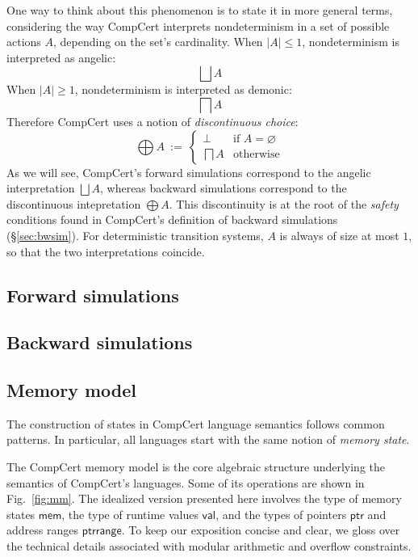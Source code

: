 \documentclass[draft,11pt]{report}
\theoremstyle{definition}
\newcommand{\kw}[1]{\ensuremath{ \mathsf{#1} }}
\begin{document}
One way to think about this phenomenon is to state it
in more general terms,
considering the way CompCert interprets nondeterminism
in a set of possible actions $A$,
depending on the set's cardinality.
When $|A| \le 1$, nondeterminism is interpreted as angelic:
\[
  \bigsqcup A
\]
When $|A| \ge 1$, nondeterminism is interpreted as demonic:
\[
  \bigsqcap A
\]
Therefore CompCert uses a notion of
\emph{discontinuous choice}:
\[
  \bigoplus A \: := \:
  \begin{cases}
    \bot & \mbox{if } A = \varnothing \\
    \bigsqcap A & \mbox{otherwise}
  \end{cases}
\]
As we will see,
CompCert's forward simulations
correspond to the angelic interpretation $\bigsqcup A$,
whereas backward simulations
correspond to the discontinuous intepretation $\bigoplus A$.
This discontinuity is at the root of the \emph{safety} conditions
found in CompCert's definition of backward simulations
(\S\ref{sec:bwsim}).
For deterministic transition systems,
$A$ is always of size at most $1$,
so that the two interpretations coincide.


\subsection{Forward simulations} \label{sec:fsim}

\subsection{Backward simulations} \label{sec:bsim}

\subsection{Memory model} \label{sec:sem:mm} %

The construction of states in CompCert language semantics
follows common patterns.
In particular,
all languages start with
the same notion of \emph{memory state}.

The CompCert memory model \citep{compcertmm,compcertmmv2}
is the core algebraic structure
underlying the semantics of CompCert's languages.
Some of its operations
are shown in Fig.~\ref{fig:mm}.
The idealized version presented here
involves
the type of memory states \kw{mem},
the type of runtime values \kw{val}, and
the types of pointers \kw{ptr} and address ranges \kw{ptrrange}.
To keep our exposition concise and clear,
we gloss over the technical details
associated with modular arithmetic and overflow constraints.
\end{document}
